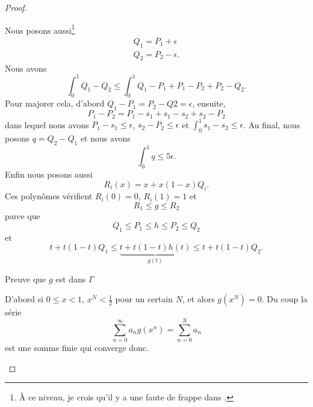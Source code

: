 \begin{proof}
\begin{subproof}
        Nous posons aussi\footnote{À ce niveau, je crois qu'il y a une faute de frappe dans \cite{ytMOpe}.}
        \begin{subequations}
            \begin{align}
                Q_1=P_1+\epsilon\\
                Q_2=P_2-\epsilon.
            \end{align}
        \end{subequations}
        Nous avons
        \begin{equation}
            \int_0^1Q_1-Q_2\leq\int_0^1 Q_1-P_1+P_1-P_2+P_2-Q_2.
        \end{equation}
        Pour majorer cela, d'abord \( Q_1-P_1=P_2-Q2=\epsilon\), ensuite,
        \begin{equation}
            P_1-P_2=P_1-s_1+s_1-s_2+s_2-P_2
        \end{equation}
        dans lequel nous avons \( P_1-s_1\leq \epsilon\), \( s_2-P_2\leq \epsilon\) et \( \int_0^1s_1-s_2\leq\epsilon\). Au final, nous posons \( q=Q_2-Q_1\) et nous avons
        \begin{equation}
            \int_0^1q\leq 5\epsilon.
        \end{equation}
        Enfin nous posons aussi
        \begin{equation}
            R_i(x)=x+x(1-x)Q_i.
        \end{equation}
        Ces polynômes vérifient \( R_i(0)=0\), \( R_i(1)=1\) et
        \begin{equation}
            R_1\leq g\leq R_2
        \end{equation}
        parce que
        \begin{equation}
            Q_1\leq P_1\leq h\leq  P_2\leq Q_2
        \end{equation}
        et
        \begin{equation}
            t+t(1-t)Q_1\leq \underbrace{t+t(1-t)h(t)}_{g(t)}\leq t+t(1-t)Q_2.
        \end{equation}
        
    \item[Preuve que \( g\) est dans \( \Gamma\)]

        D'abord si \( 0\leq x<1\), \( x^N<\frac{ 1 }{2}\) pour un certain \( N\), et alors \( g(x^N)=0\). Du coup la série
        \begin{equation}
            \sum_{n=0}^{\infty}a_ng(x^n)=\sum_{n=0}^{N}a_n
        \end{equation}
        est une somme finie qui converge donc.


\end{subproof}
\end{proof}
